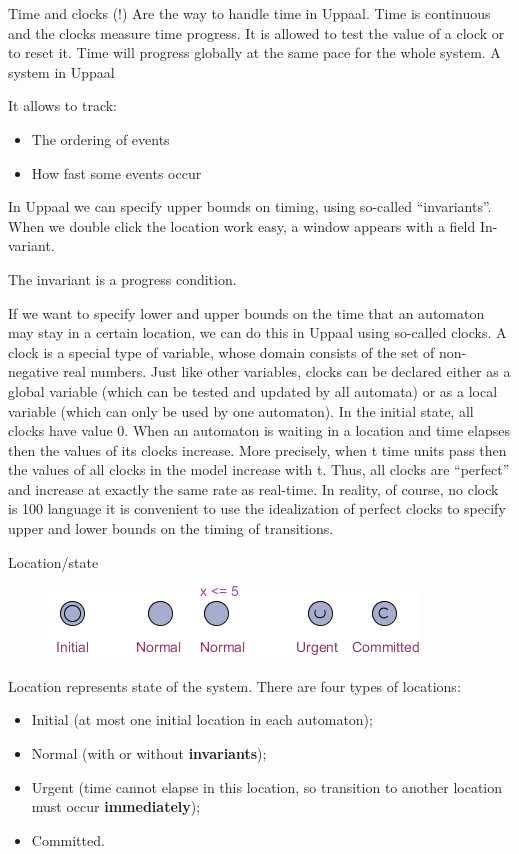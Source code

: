 \documentclass{beamer}
\begin{document}
\begin{frame}{Time and clocks}
	(!) Are the way to handle time in Uppaal. Time is continuous and the clocks measure time progress. It is allowed to test the value of a clock or to reset it. Time will progress globally at the same pace for the whole system. A system in Uppaal
	
	It allows to track:
	\begin{itemize}
		\item The ordering of events
		\item How fast some events occur
	\end{itemize}
	
	In Uppaal we can specify upper bounds on timing, using so-called “invariants”.
	When we double click the location work easy, a window appears with a field In-variant.
	
	The invariant is a progress condition.
	
	If we want to specify lower and upper bounds on the time that an automaton may
	stay in a certain location, we can do this in Uppaal using so-called clocks. A clock
	is a special type of variable, whose domain consists of the set of non-negative real
	numbers. Just like other variables, clocks can be declared either as a global variable
	(which can be tested and updated by all automata) or as a local variable (which can
	only be used by one automaton). In the initial state, all clocks have value 0. When
	an automaton is waiting in a location and time elapses then the values of its clocks
	increase. More precisely, when t time units pass then the values of all clocks in the
	model increase with t. Thus, all clocks are “perfect” and increase at exactly the same
	rate as real-time. In reality, of course, no clock is 100%
	language it is convenient to use the idealization of perfect clocks to specify upper
	and lower bounds on the timing of transitions.
\end{frame}

\begin{frame}{Location/state}
	\begin{figure}[H]
		\includegraphics[scale=1]{img/uppaal_locations.png}
	\end{figure}
	
	Location represents state of the system. There are four types of locations:
	\begin{itemize}
		\item Initial (at most one initial location in each automaton);
		\item Normal (with or without \textbf{invariants});
		\item Urgent (time cannot elapse in this location, so transition to another location must occur \textbf{immediately});
		\item Committed.
	\end{itemize}
\end{frame}
\end{document}
